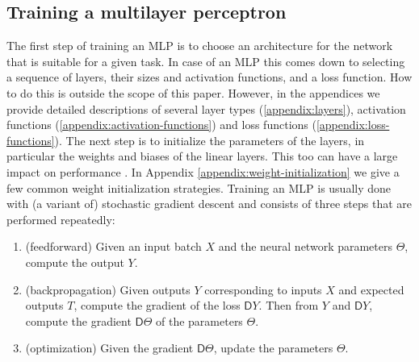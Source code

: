 \documentclass[twoside,11pt]{article}
\newcommand{\Gradient}{\textsf{D}}
\begin{document}
\subsection{Training a multilayer perceptron}
The first step of training an MLP is to choose an architecture for the network that is suitable for a given task. In case of an MLP this comes down to selecting a sequence of layers, their sizes and activation functions, and  a loss function. How to do this is outside the scope of this paper. However, in the appendices we provide detailed descriptions of several layer types (\ref{appendix:layers}), activation functions (\ref{appendix:activation-functions}) and loss functions (\ref{appendix:loss-functions}).
The next step is to initialize the parameters of the layers, in particular the weights and biases of the linear layers. This too can have a large impact on performance \citep{DBLP:journals/corr/abs-1805-08266}. In Appendix \ref{appendix:weight-initialization} we give a few common weight initialization strategies.
Training an MLP is usually done with (a variant of) stochastic gradient descent and consists of three steps that are performed repeatedly:
\begin{enumerate}
    \item (feedforward) Given an input batch $X$ and the neural network parameters $\Theta$, compute the output $Y$.
    \item (backpropagation) Given outputs $Y$ corresponding to inputs $X$ and expected outputs $T$, compute the gradient of the loss $\Gradient Y$. Then from $Y$ and $\Gradient Y$, compute the gradient $\Gradient \Theta$ of the parameters $\Theta$.
    \item (optimization) Given the gradient $\Gradient \Theta$, update the parameters $\Theta$.
\end{enumerate}
\end{document}

